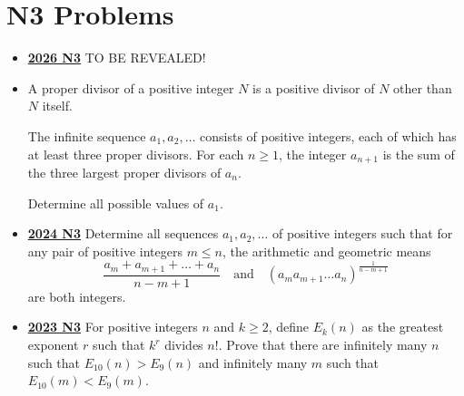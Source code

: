 \documentclass[11pt]{scrartcl}
\begin{document}
\section*{N3 Problems} \label{N3}
\begin{itemize}[leftmargin=*]


\item \href{https://www.imo-official.org/assets/documents/problems/2026/IMO2026SL.pdf}{\textbf{2026 N3}} TO BE REVEALED!

\item {} A proper divisor of a positive integer $N$ is a positive divisor of $N$ other than $N$ itself.

The infinite sequence $a_1, a_2, \dots$ consists of positive integers, each of which has at least three proper divisors. For each $n\geqslant  1$, the integer $a_{n+1}$ is the sum of the three largest proper divisors of $a_n$.

Determine all possible values of $a_1$.

\item \href{https://artofproblemsolving.com/community/c6h3610437p35340905}{\textbf{2024 N3}} Determine all sequences $a_1, a_2, \dots$ of positive integers such that for any pair of positive integers $m\leqslant n$, the arithmetic and geometric means
\[ \frac{a_m + a_{m+1} + \dots + a_n}{n-m+1}\quad\text{and}\quad (a_ma_{m+1}\dots a_n)^{\frac{1}{n-m+1}}\]are both integers.	

\item \href{https://artofproblemsolving.com/community/c6h3359721p31218370}{\textbf{2023 N3}}  For positive integers $n$ and $k \geqslant  2$, define $E_k(n)$ as the greatest exponent $r$ such that $k^r$ divides $n!$. Prove that there are infinitely many $n$ such that $E_{10}(n) > E_9(n)$ and infinitely many $m$ such that $E_{10}(m) < E_9(m)$.	


\end{itemize}
\end{document}
